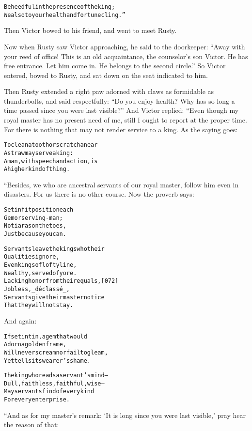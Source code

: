 \documentclass{article}
\renewenvironment{verbatim}{\begin{alltt}\normalfont\begin{centering}}{\end{centering}\end{alltt}}
\begin{document}
\begin{verbatim}
Be heedful in the presence of the king;
We also to your health and fortune cling.”
\end{verbatim}
Then Victor bowed to his friend, and went to meet Rusty.

Now when Rusty saw Victor approaching, he said to the doorkeeper:
``Away with your reed of office! This is an old acquaintance, the counselor's son Victor. He has free entrance. Let him come in. He belongs to the second circle.''
So Victor entered, bowed to Rusty, and sat down on the seat
indicated to him.

Then Rusty extended a right paw adorned with claws as formidable as
thunderbolts, and said respectfully:
``Do you enjoy health? Why has so long a time passed since you were last visible?''
And Victor replied: “Even though my royal master has no present
need of me, still I ought to report at the proper time. For there
is nothing that may not render service to a king. As the saying
goes:

\begin{verbatim}
To clean a tooth or scratch an ear
    A straw may serve a king:
A man, with speech and action, is
    A higher kind of thing.
\end{verbatim}
“Besides, we who are ancestral servants of our royal master, follow
him even in disasters. For us there is no other course. Now the
proverb says:

\begin{verbatim}
Set in fit position each
    Gem or serving-man;
No tiaras on the toes,
    Just because you can.

Servants leave the kings who their
    Qualities ignore,
Even kings of lofty line,
    Wealthy, served of yore.
Lacking honor from their equals,                        [072]
    Jobless, _déclassé_,
Servants give their master notice
    That they will not stay.
\end{verbatim}
And again:

\begin{verbatim}
If set in tin, a gem that would
    Adorn a golden frame,
Will never scream nor fail to gleam,
    Yet tells its wearer's shame.

The king who reads a servant's mind--
    Dull, faithless, faithful, wise--
May servants find of every kind
    For every enterprise.
\end{verbatim}
“And as for my master's remark:
`It is long since you were last visible,' pray hear the reason of
that:
\end{document}
